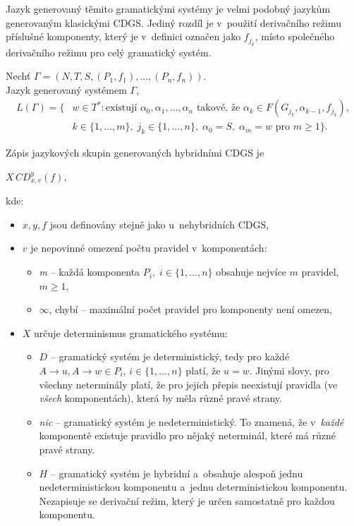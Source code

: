 Jazyk generovaný těmito gramatickými systémy je velmi podobný jazykům generovaným klasickými CDGS.
Jediný rozdíl je v~použití derivačního režimu příslušné komponenty, který je v~definici označen jako $f_{j_k}$, místo společného derivačního režimu pro celý gramatický systém.
\begin{definition}
    Nechť $\Gamma = (N, T, S, (P_1, f_1), \ldots, (P_n, f_n))$.\\
    Jazyk generovaný systémem $\Gamma$,
    \begin{align*}
        L(\Gamma) = \{&w \in T^*: \text{existují } \alpha_0, \alpha_1,\ldots, \alpha_n \text{ takové, že } \alpha_k \in F(G_{j_k}, \alpha_{k-1}, f_{j_k}),\\
        &k \in \{1, \ldots, m\},\; j_k \in \{1, \ldots, n\},\; \alpha_0 = S,\;\alpha_m = w \text{ pro } m \geq 1\}.
    \end{align*}
\end{definition}

Zápis jazykových skupin generovaných hybridními CDGS je
\begin{center}
    $X\,CD^y_{x, v}(f) $, 
\end{center}
kde:
\begin{itemize}
    \item $x, y, f$ jsou definovány stejně jako u~nehybridních CDGS,
    \item $v$ je nepovinné omezení počtu pravidel v~komponentách:
    \begin{itemize}[label=$\circ$]
        \item \emph{m} -- každá komponenta $P_i,\; i \in \{1, \ldots, n\}$ obsahuje nejvíce $m$ pravidel, $m \geq 1$,
        \item $\infty$, chybí --  maximální počet pravidel pro komponenty není omezen,
    \end{itemize}
    \item $X$ určuje determinismus gramatického systému:
    \begin{itemize}[label=$\circ$]
        \item $D$ -- gramatický systém je deterministický, tedy pro každé $A \rightarrow u, A \rightarrow w \in P_i$, $i \in \{1, \ldots, n\}$ platí, že $u = w$.
        Jinými slovy, pro všechny neterminály platí, že pro jejich přepis neexistují pravidla (ve \emph{všech} komponentách), která by měla různé pravé strany.
        \item \emph{nic} -- gramatický systém je nedeterministický.
        To znamená, že v~\emph{každé} komponentě existuje pravidlo pro nějaký neterminál, které má různé pravé strany.
        \item $H$ -- gramatický systém je hybridní a~obsahuje alespoň jednu nedeterministickou komponentu a~jednu deterministickou komponentu.
        Nezapisuje se derivační režim, který je určen samostatně pro každou komponentu. 
    \end{itemize}
\end{itemize}

